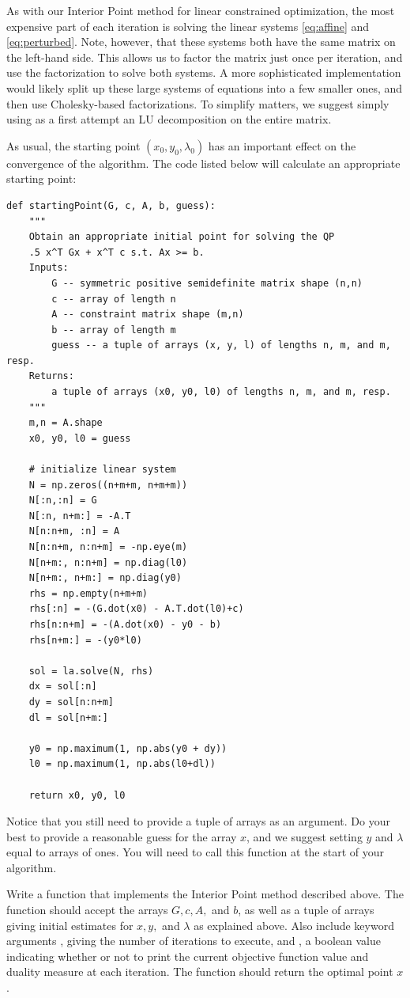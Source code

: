 As with our Interior Point method for linear constrained optimization, the most expensive part of each iteration
is solving the linear systems \ref{eq:affine} and \ref{eq:perturbed}. Note, however, that these systems both have
the same matrix on the left-hand side. This allows us to factor the matrix just once per iteration, and use the
factorization to solve both systems. A more sophisticated implementation would likely split up these large
systems of equations into a few smaller ones, and then use Cholesky-based factorizations. To simplify matters, we
suggest simply using as a first attempt an LU decomposition on the entire matrix.

As usual, the starting point $(x_0, y_0, \lambda_0)$ has an important effect on the convergence of the algorithm.
The code listed below will calculate an appropriate starting point:
\begin{lstlisting}
def startingPoint(G, c, A, b, guess):
    """
    Obtain an appropriate initial point for solving the QP
    .5 x^T Gx + x^T c s.t. Ax >= b.
    Inputs:
        G -- symmetric positive semidefinite matrix shape (n,n)
        c -- array of length n
        A -- constraint matrix shape (m,n)
        b -- array of length m
        guess -- a tuple of arrays (x, y, l) of lengths n, m, and m, resp.
    Returns:
        a tuple of arrays (x0, y0, l0) of lengths n, m, and m, resp.
    """
    m,n = A.shape
    x0, y0, l0 = guess

    # initialize linear system
    N = np.zeros((n+m+m, n+m+m))
    N[:n,:n] = G
    N[:n, n+m:] = -A.T
    N[n:n+m, :n] = A
    N[n:n+m, n:n+m] = -np.eye(m)
    N[n+m:, n:n+m] = np.diag(l0)
    N[n+m:, n+m:] = np.diag(y0)
    rhs = np.empty(n+m+m)
    rhs[:n] = -(G.dot(x0) - A.T.dot(l0)+c)
    rhs[n:n+m] = -(A.dot(x0) - y0 - b)
    rhs[n+m:] = -(y0*l0)

    sol = la.solve(N, rhs)
    dx = sol[:n]
    dy = sol[n:n+m]
    dl = sol[n+m:]

    y0 = np.maximum(1, np.abs(y0 + dy))
    l0 = np.maximum(1, np.abs(l0+dl))

    return x0, y0, l0
\end{lstlisting}
Notice that you still need to provide a tuple of arrays  as an argument.
Do your best to provide a reasonable guess for the array $x$, and we suggest setting $y$ and $\lambda$
equal to arrays of ones. You will need to call this function at the start of your algorithm.

\begin{problem}
Write a function  that implements the Interior Point method described above.
The function should accept the arrays $G, c, A,$ and $b$, as well as a tuple of arrays 
giving initial estimates for $x, y,$ and $\lambda$ as explained above. Also include keyword
arguments , giving the number of iterations to execute, and , a boolean value
indicating whether or not to print the current objective function value and duality measure at each
iteration. The function should return the optimal point $x$.
\end{problem}

